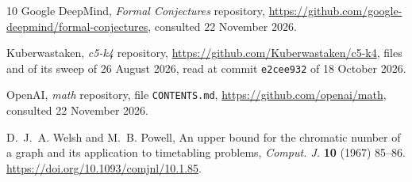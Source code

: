 \documentclass[11pt,a4paper]{article}
\theoremstyle{definition}
\theoremstyle{remark}
\begin{document}
\begin{thebibliography}{10}
 Google DeepMind, \emph{Formal Conjectures} repository,
\url{https://github.com/google-deepmind/formal-conjectures}, consulted 22 November 2026.

 Kuberwastaken, \emph{c5-k4} repository,
\url{https://github.com/Kuberwastaken/c5-k4}, files  and  of its sweep of 26 August 2026,
read at commit \texttt{e2cee932}
of 18 October 2026.

 OpenAI, \emph{math} repository, file \texttt{CONTENTS.md},
\url{https://github.com/openai/math}, consulted 22 November 2026.

 D.~J.~A. Welsh and M.~B. Powell, An upper bound for the chromatic number of a graph and
its application to timetabling problems, \emph{Comput. J.} \textbf{10} (1967) 85--86.
\url{https://doi.org/10.1093/comjnl/10.1.85}.

\end{thebibliography}
\end{document}
